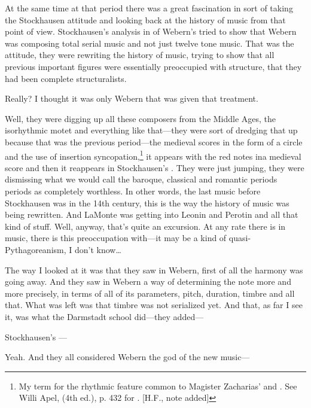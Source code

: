 At the same time at that period there was a great fascination in sort 
of taking the Stockhausen attitude and looking back at the history of 
music from that point of view. Stockhausen's analysis in  of 
Webern's  tried to show that Webern was 
composing total serial music and not just twelve tone music. That was 
the attitude, they were rewriting the history of music, trying to show 
that all previous important figures were essentially preoccupied with 
structure, that they had been complete structuralists. 

 Really? I thought it was only Webern that was given that 
treatment. 

 Well, they were digging up all these composers from the 
Middle Ages, the isorhythmic motet and everything like that---they 
were sort of dredging that up because that was the previous 
period---the medieval scores in the form of a circle and the use of insertion 
syncopation,\footnote{My term for the rhythmic feature common to Magister Zacharias'  and . See Willi Apel,  (4th ed.), p. 432 for . [H.F., note added]}
it appears with the red notes ina medieval score and then 
it reappears in Stockhausen's . They were just jumping, 
they were dismissing what we would call the baroque, classical and 
romantic periods periods as completely worthless. In other words, the 
last music before Stockhausen was in the 14th century, this is the way 
the history of music was being rewritten. And LaMonte was getting 
into Leonin and Perotin and all that kind of stuff. Well, anyway, that's 
quite an excursion. 
At any rate there is in music, there is this preoccupation with---it 
may be a kind of quasi-Pythagoreanism, I don't know\ldots

 The way I looked at it was that they saw in Webern, first of 
all the harmony was going away. And they saw in Webern a way of 
determining the note more and more precisely, in terms of all of its 
parameters, pitch, duration, timbre and all that. What was left was that 
timbre was not serialized yet. And that, as far I see it, was what the 
Darmstadt school did---they added--- 

 Stockhausen's --- 

 Yeah. And they all considered Webern the god of the new 
music--- 

